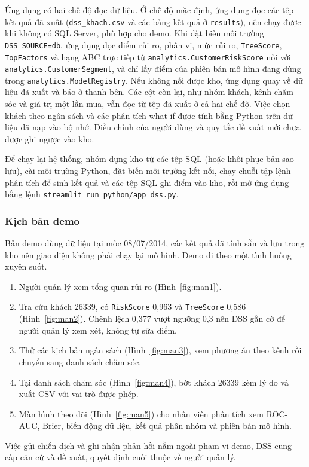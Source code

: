 Ứng dụng có hai chế độ đọc dữ liệu. Ở chế độ mặc định, ứng dụng đọc các tệp kết quả đã xuất (\texttt{dss\_khach.csv} và các bảng kết quả ở \texttt{results}), nên chạy được khi không có SQL Server, phù hợp cho demo. Khi đặt biến môi trường \texttt{DSS\_SOURCE=db}, ứng dụng đọc điểm rủi ro, phân vị, mức rủi ro, \texttt{TreeScore}, \texttt{TopFactors} và hạng ABC trực tiếp từ \texttt{analytics.\allowbreak CustomerRiskScore} nối với \texttt{analytics.\allowbreak CustomerSegment}, và chỉ lấy điểm của phiên bản mô hình đang dùng trong \texttt{analytics.\allowbreak ModelRegistry}. Nếu không nối được kho, ứng dụng quay về dữ liệu đã xuất và báo ở thanh bên. Các cột còn lại, như nhóm khách, kênh chăm sóc và giá trị một lần mua, vẫn đọc từ tệp đã xuất ở cả hai chế độ. Việc chọn khách theo ngân sách và các phân tích what-if được tính bằng Python trên dữ liệu đã nạp vào bộ nhớ. Điều chỉnh của người dùng và quy tắc đề xuất mới chưa được ghi ngược vào kho.

Để chạy lại hệ thống, nhóm dựng kho từ các tệp SQL (hoặc khôi phục bản sao lưu), cài môi trường Python, đặt biến môi trường kết nối, chạy chuỗi tập lệnh phân tích để sinh kết quả và các tệp SQL ghi điểm vào kho, rồi mở ứng dụng bằng lệnh \texttt{streamlit run python/app\_dss.py}.

\subsubsection{Kịch bản demo}
Bản demo dùng dữ liệu tại mốc 08/07/2014, các kết quả đã tính sẵn và lưu trong kho nên giao diện không phải chạy lại mô hình. Demo đi theo một tình huống xuyên suốt.
\begin{enumerate}
    \item Người quản lý xem tổng quan rủi ro (Hình~\ref{fig:man1}).
    \item Tra cứu khách 26339, có \texttt{RiskScore} 0,963 và \texttt{TreeScore} 0,586 (Hình~\ref{fig:man2}). Chênh lệch 0,377 vượt ngưỡng 0,3 nên DSS gắn cờ để người quản lý xem xét, không tự sửa điểm.
    \item Thử các kịch bản ngân sách (Hình~\ref{fig:man3}), xem phương án theo kênh rồi chuyển sang danh sách chăm sóc.
    \item Tại danh sách chăm sóc (Hình~\ref{fig:man4}), bớt khách 26339 kèm lý do và xuất CSV với vai trò được phép.
    \item Màn hình theo dõi (Hình~\ref{fig:man5}) cho nhân viên phân tích xem ROC-AUC, Brier, biến động dữ liệu, kết quả phân nhóm và phiên bản mô hình.
\end{enumerate}
Việc gửi chiến dịch và ghi nhận phản hồi nằm ngoài phạm vi demo, DSS cung cấp căn cứ và đề xuất, quyết định cuối thuộc về người quản lý.

